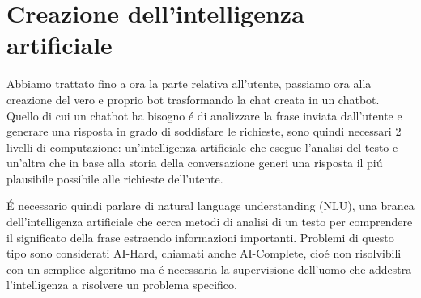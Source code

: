 \section{Creazione dell'intelligenza artificiale}

Abbiamo trattato fino a ora la parte relativa all'utente, passiamo ora alla creazione del vero e proprio bot trasformando la chat creata in un chatbot. Quello di cui un chatbot ha bisogno \'e di analizzare la frase inviata dall'utente e generare una risposta in grado di soddisfare le richieste, sono quindi necessari 2 livelli di computazione: un'intelligenza artificiale che esegue l'analisi del testo e un'altra che in base alla storia della conversazione generi una risposta il pi\'u plausibile possibile alle richieste dell'utente.

\'E necessario quindi parlare di natural language understanding (NLU), una branca dell'intelligenza artificiale che cerca metodi di analisi di un testo per comprendere il significato della frase estraendo informazioni importanti. Problemi di questo tipo sono considerati AI-Hard, chiamati anche AI-Complete, cio\'e non risolvibili con un semplice algoritmo ma \'e necessaria la supervisione dell'uomo che addestra l'intelligenza a risolvere un problema specifico.

